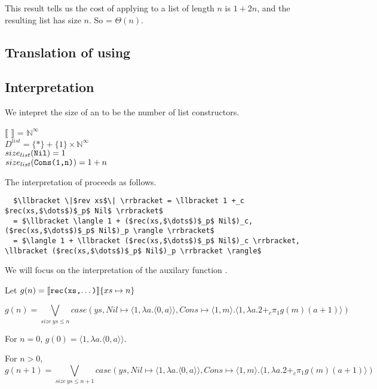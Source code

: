 This result tells us the cost of applying  to a list  of length $n$ is $1+2n$, and the resulting list has size $n$.
So  = $\Theta(n)$.




\subsection*{Translation of  using }

\subsection*{Interpretation}

We intepret the size of an  to be the number of list constructors.
\begin{framed}
$\llbracket$  $\rrbracket$ = $\mathbb{N}^\infty$\\
$D^{list} = \{\ast\} + \{1\} \times \mathbb{N}^\infty$\\
$size_{list}(\texttt{Nil}) = 1$\\
$size_{list}(\texttt{Cons(1,n)}) = 1 + n$\\
\end{framed}

The interpretation of  proceeds as follows.
\begin{lstlisting}
  $\llbracket \|$rev xs$\| \rrbracket = \llbracket 1 +_c $rec(xs,$\dots$)$_p$ Nil$ \rrbracket$
  = $\llbracket \langle 1 + ($rec(xs,$\dots$)$_p$ Nil$)_c, ($rec(xs,$\dots$)$_p$ Nil$)_p \rangle \rrbracket$
  = $\langle 1 + \llbracket ($rec(xs,$\dots$)$_p$ Nil$)_c \rrbracket, \llbracket ($rec(xs,$\dots$)$_p$ Nil$)_p \rrbracket \rangle$
\end{lstlisting}

We will focus on the interpretation of the auxilary function .

Let $g(n) = \llbracket \texttt{rec(xs,$\dots$)} \rrbracket \{xs \mapsto n\}$

\[g(n) = \bigvee_{size\ ys \leq n} case(ys, Nil \mapsto \langle1,\lambda a.\langle 0,a\rangle\rangle, Cons \mapsto \langle 1,m \rangle.\langle 1, \lambda a. 2 +_c \pi_1g(m) (a+1)\rangle)\]

For $n=0$, $g(0) = \langle 1,\lambda a.\langle 0,a\rangle\rangle$.

For $n>0$,
\[g(n+1) = \bigvee_{size\ ys \leq n+1} case(ys, Nil \mapsto \langle1,\lambda a.\langle 0,a\rangle\rangle, Cons \mapsto \langle 1,m \rangle.\langle 1, \lambda a. 2 +_c \pi_1g(m) (a+1)\rangle)\]

